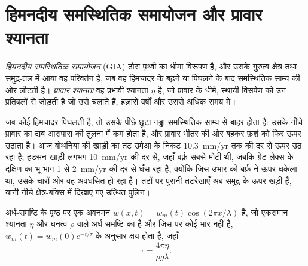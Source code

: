 \section{हिमनदीय समस्थितिक समायोजन और प्रावार श्यानता}\label{sec:b3:mantle-convection:gia}

\begin{definition}\label{def:b3:mantle-convection:gia}
\emph{हिमनदीय समस्थितिक समायोजन} (GIA)
ठोस पृथ्वी का धीमा विरूपण है, और उसके गुरुत्व क्षेत्र तथा
समुद्र-तल में आया वह परिवर्तन है, जब वह हिमचादर के बढ़ने या पिघलने के बाद
समस्थितिक साम्य की ओर लौटती है। \emph{प्रावार श्यानता}
वह प्रभावी श्यानता $\eta$ है, जो प्रावार के धीमे, स्थायी
विसर्पण को उन प्रतिबलों से जोड़ती है जो उसे चलाते हैं, हज़ारों वर्षों और उससे अधिक समय में।
\end{definition}

जब कोई हिमचादर पिघलती है, तो उसके पीछे छूटा गड्ढा समस्थितिक साम्य से बाहर होता है:
उसके नीचे प्रावार का दाब आसपास की तुलना में कम होता है, और
प्रावार भीतर की ओर बहकर फ़र्श को फिर ऊपर उठाता है। आज बोथनिया की खाड़ी का तट
उमेआ के निकट \qty{10.3}{mm/yr} तक की दर से ऊपर उठ रहा है; हडसन खाड़ी लगभग
\qty{10}{mm/yr} की दर से, जहाँ बर्फ़ सबसे मोटी थी, जबकि ग्रेट लेक्स के दक्षिण का भू-भाग
1 से \qty{2}{mm/yr} की दर से धँस रहा है, क्योंकि जिस उभार को बर्फ़ ने ऊपर धकेला था,
उसके चारों ओर वह अवधसित हो रहा है। तटों पर पुरानी तटरेखाएँ अब समुद्र के ऊपर खड़ी हैं, यानी
नीचे क्षेत्र-बॉक्स में दिखाए गए उत्थित पुलिन।

\begin{theorem}[श्यान अर्ध-समष्टि का शिथिलन]\label{thm:b3:mantle-convection:relaxation}
अर्ध-समष्टि के पृष्ठ पर एक अवनमन $w(x, t) = w_m(t)\cos(2\pi x/\lambda)$ है,
जो एकसमान श्यानता $\eta$ और घनत्व $\rho$ वाले अर्ध-समष्टि का है और जिस पर कोई भार नहीं है,
$w_m(t) = w_m(0)e^{-t/\tau}$ के अनुसार क्षय होता है, जहाँ
\[
  \tau = \frac{4\pi\eta}{\rho g\lambda} .
\]
\end{theorem}

